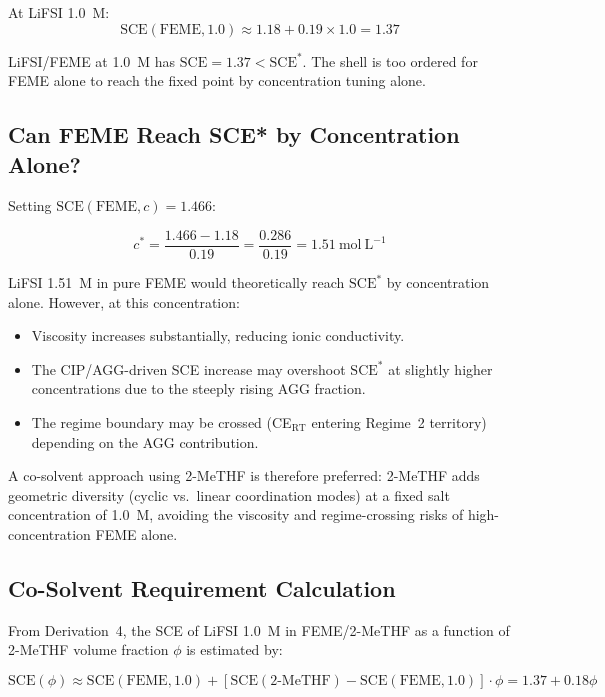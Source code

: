 \documentclass[11pt]{article}
\theoremstyle{plain}
\theoremstyle{definition}
\theoremstyle{remark}
\begin{document}
At LiFSI 1.0~M:
\begin{equation}
  \mathrm{SCE}(\mathrm{FEME}, 1.0) \approx 1.18 + 0.19 \times 1.0
  = 1.37
  \label{eq:FEME_1M_SCE}
\end{equation}

LiFSI/FEME at 1.0~M has $\mathrm{SCE} = 1.37 < \mathrm{SCE}^{*}$.
The shell is too ordered for FEME alone to reach the fixed point by
concentration tuning alone.

\subsection{Can FEME Reach SCE* by Concentration Alone?}

Setting $\mathrm{SCE}(\mathrm{FEME}, c) = 1.466$:

\begin{equation}
  c^{*} = \frac{1.466 - 1.18}{0.19} = \frac{0.286}{0.19}
  = 1.51~\mathrm{mol~L}^{-1}
  \label{eq:FEME_cstar}
\end{equation}

LiFSI 1.51~M in pure FEME would theoretically reach $\mathrm{SCE}^{*}$
by concentration alone.  However, at this concentration:
\begin{itemize}[leftmargin=2em]
  \item Viscosity increases substantially, reducing ionic conductivity.
  \item The CIP/AGG-driven SCE increase may overshoot $\mathrm{SCE}^{*}$
        at slightly higher concentrations due to the steeply rising
        AGG fraction.
  \item The regime boundary may be crossed (CE$_\mathrm{RT}$ entering
        Regime~2 territory) depending on the AGG contribution.
\end{itemize}

A co-solvent approach using 2-MeTHF is therefore preferred:
2-MeTHF adds geometric diversity (cyclic vs.\ linear coordination
modes) at a fixed salt concentration of 1.0~M, avoiding the viscosity
and regime-crossing risks of high-concentration FEME alone.

\subsection{Co-Solvent Requirement Calculation}

From Derivation~4, the SCE of LiFSI 1.0~M in FEME/2-MeTHF as a
function of 2-MeTHF volume fraction $\phi$ is estimated by:

\begin{equation}
  \mathrm{SCE}(\phi) \approx
  \mathrm{SCE}(\mathrm{FEME}, 1.0) +
  [\mathrm{SCE}(\mathrm{2\text{-}MeTHF}) -
  \mathrm{SCE}(\mathrm{FEME}, 1.0)] \cdot \phi
  = 1.37 + 0.18\phi
  \label{eq:FEME_coslv}
\end{equation}
\end{document}
